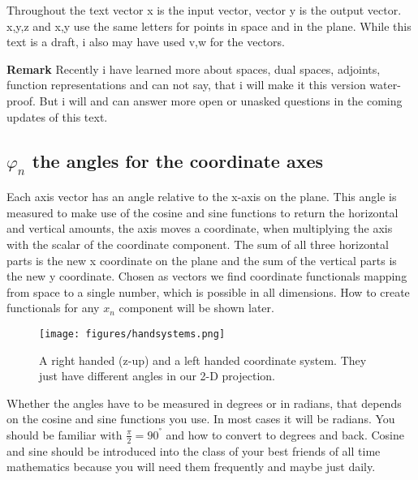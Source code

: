 \documentclass[a4paper]{article}
\begin{document}
Throughout the text vector x is the input vector, vector y is the output vector. x,y,z and x,y use the same letters for points in space and in the plane. While this text is a draft, i also may have used v,w for the vectors.

\textbf{Remark} Recently i have learned more about spaces, dual spaces, adjoints, function representations and can not say, that i will make it this version water-proof. But i will and can answer more open or unasked questions in the coming updates of this text.

\subsection{$\varphi_{n}$ the angles for the coordinate axes}

Each axis vector has an angle relative to the x-axis on the plane. This angle is measured to make use of the cosine and sine functions to return the horizontal and vertical amounts, the axis moves a coordinate, when multiplying the axis with the scalar of the coordinate component. The sum of all three horizontal parts is the new x coordinate on the plane and the sum of the vertical parts is the new y coordinate. Chosen as vectors we find coordinate functionals mapping from space to a single number, which is possible in all dimensions. How to create functionals for any $x_n$ component will be shown later.

\begin{figure}[ht]
\label{handsystems}
\texttt{[image: figures/handsystems.png]}
\caption{A right handed (z-up) and a left handed coordinate system. They just have different angles in our 2-D projection.}
\end{figure}

Whether the angles have to be measured in degrees or in radians, that depends on the cosine and sine functions you use.
In most cases it will be radians. You should be familiar with $\frac{\pi}{2} = 90^{°}$ and how to convert to degrees and back.
Cosine and sine should be introduced into the class of your best friends of all time mathematics because you will need them frequently and maybe just daily.

\\
\end{document}
